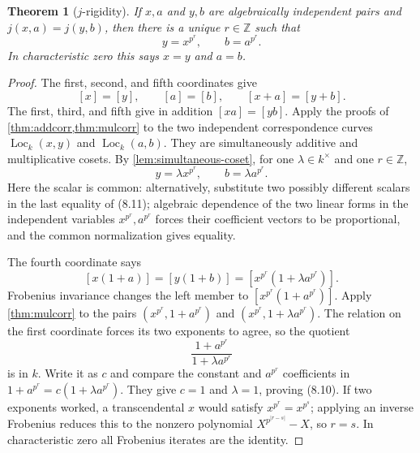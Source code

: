 \documentclass[11pt,oneside]{article}
\newtheorem{theorem}{Theorem}[section]
\theoremstyle{definition}
\theoremstyle{remark}
\newcommand{\Loc}{\operatorname{Loc}}
\begin{document}
\begin{theorem}[$j$-rigidity]\label{thm:jrigidity}
If $x,a$ and $y,b$ are algebraically independent pairs and
$j(x,a)=j(y,b)$, then there is a unique $r\in\mathbb Z$ such that
\[
 y=x^{p^r},\qquad b=a^{p^r}.                                   \tag{8.10}
\]
In characteristic zero this says $x=y$ and $a=b$.
\end{theorem}
\begin{proof}
The first, second, and fifth coordinates give
\[
 [x]=[y],\qquad[a]=[b],\qquad[x+a]=[y+b].                       \tag{8.11}
\]
The first, third, and fifth give in addition $[xa]=[yb]$.  Apply the proofs of
\cref{thm:addcorr,thm:mulcorr} to the two independent correspondence curves
$\Loc_k(x,y)$ and $\Loc_k(a,b)$.  They are simultaneously additive and multiplicative
cosets.  By \cref{lem:simultaneous-coset}, for one $\lambda\in k^\times$ and one
$r\in\mathbb Z$,
\[
 y=\lambda x^{p^r},\qquad b=\lambda a^{p^r}.                    \tag{8.12}
\]
Here the scalar is common: alternatively, substitute two possibly different scalars in
the last equality of (8.11); algebraic dependence of the two linear forms in the
independent variables $x^{p^r},a^{p^r}$ forces their coefficient vectors to be
proportional, and the common normalization gives equality.

The fourth coordinate says
\[
 [x(1+a)]=[y(1+b)]
 =[x^{p^r}(1+\lambda a^{p^r})].                                \tag{8.13}
\]
Frobenius invariance changes the left member to
$[x^{p^r}(1+a^{p^r})]$.  Apply \cref{thm:mulcorr} to the pairs
$(x^{p^r},1+a^{p^r})$ and $(x^{p^r},1+\lambda a^{p^r})$.
The relation on the first coordinate forces its two exponents to agree, so the quotient
\[
 \frac{1+a^{p^r}}{1+\lambda a^{p^r}}
\]
is in $k$.  Write it as $c$ and compare the constant and $a^{p^r}$ coefficients in
$1+a^{p^r}=c(1+\lambda a^{p^r})$.  They give $c=1$ and $\lambda=1$, proving (8.10).
If two exponents worked, a transcendental $x$ would satisfy
$x^{p^r}=x^{p^s}$; applying an inverse Frobenius reduces this to the nonzero polynomial
$X^{p^{|r-s|}}-X$, so $r=s$.  In characteristic zero all Frobenius iterates are the
identity.
\end{proof}
\end{document}
